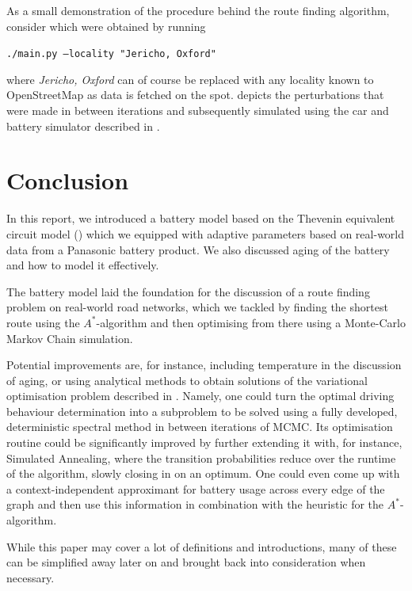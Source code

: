 \documentclass{prettytex/ox/mmsc-special-topic}
\begin{document}
  As a small demonstration of the procedure behind the route finding algorithm, consider  which were obtained by running \\
  \centerline{\texttt{./main.py --locality "Jericho, Oxford"}}
  where \textit{Jericho, Oxford} can of course be replaced with any locality known to OpenStreetMap as data is fetched on the spot.
   depicts the perturbations that were made in between iterations and subsequently simulated using the car and battery simulator described in .

  \section{Conclusion}
  \label{sec:discussion}
  In this report, we introduced a battery model based on the Thevenin equivalent circuit model () which we equipped with adaptive parameters based on real-world data from a Panasonic battery product.
  We also discussed aging of the battery and how to model it effectively.

  The battery model laid the foundation for the discussion of a route finding problem on real-world road networks, which we tackled by finding the shortest route using the $A^*$-algorithm and then optimising from there using a Monte-Carlo Markov Chain simulation.

  Potential improvements are, for instance, including temperature in the discussion of aging, or using analytical methods to obtain solutions of the variational optimisation problem described in .
  Namely, one could turn the optimal driving behaviour determination into a subproblem to be solved using a fully developed, deterministic spectral method in between iterations of MCMC.
  Its optimisation routine could be significantly improved by further extending it with, for instance, Simulated Annealing, where the transition probabilities reduce over the runtime of the algorithm, slowly closing in on an optimum.
  One could even come up with a context-independent approximant for battery usage across every edge of the graph and then use this information in combination with the heuristic for the $A^*$-algorithm.

  While this paper may cover a lot of definitions and introductions, many of these can be simplified away later on and brought back into consideration when necessary.
\end{document}
